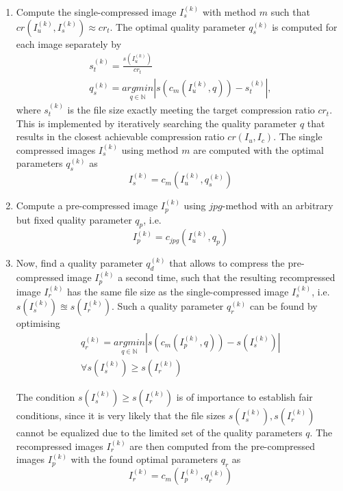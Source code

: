 \documentclass[10pt,twocolumn,letterpaper]{article}
\begin{document}
\begin{enumerate}
	\item Compute the single-compressed image $I_s^{(k)}$ with method $m$ such that $cr(I_u^{(k)}, I_s^{(k)}) \approx cr_t$. The optimal quality parameter $q_s^{(k)}$ is computed for each image separately by
	\begin{eqnarray}
	s_t^{(k)} = \frac{s(I_u^{(k)})}{cr_t} \\
	q_s^{(k)} = \underset{q \in \mathbb{N}}{argmin}|s(c_m(I_u^{(k)},q)) - s_t^{(k)}|,
	\end{eqnarray} where $s_t^{(k)}$ is the file size exactly meeting the target compression ratio $cr_t$. This is implemented by iteratively searching the quality parameter $q$ that results in the closest achievable compression ratio $cr(I_u, I_c)$. The single compressed images $I_s^{(k)}$ using method $m$ are computed with the optimal parameters $ q_s^{(k)}$ as
	\begin{equation}
	I_s^{(k)} = c_m(I_u^{(k)}, q_s^{(k)})
	\end{equation}
	
	\item Compute a pre-compressed image $I_p^{(k)}$ using $jpg$-method with an arbitrary but fixed quality parameter $q_p$, i.e. 
	\begin{equation}
		I_p^{(k)} = c_{jpg}(I_u^{(k)}, q_p)
	\end{equation}
	
	\item Now, find a quality parameter $q_d^{(k)}$ that allows to compress the pre-compressed image $I_p^{(k)}$ a second time, such that the resulting recompressed image $I_r^{(k)}$ has the same file size as the single-compressed image $I_s^{(k)}$, i.e. $s(I_s^{(k)}) \approxeq s(I_r^{(k)})$. Such a quality parameter $q_r^{(k)}$ can be found by optimising
	\begin{eqnarray}	
		q_r^{(k)} = \underset{q \in \mathbb{N}}{argmin}|s(c_m(I_p^{(k)},q)) - s(I_s^{(k)})| \\
		\forall s(I_s^{(k)}) \geq s(I_r^{(k)})
		\label{equ:recomp}
	\end{eqnarray}
	
The condition $s(I_s^{(k)}) \geq s(I_r^{(k)})$ is of importance to establish fair conditions, since it is very likely that the file sizes $s(I_s^{(k)}), s(I_r^{(k)})$  cannot be equalized due to the limited set of the quality parameters $q$. The recompressed images $I_r^{(k)}$ are then computed from the pre-compressed images $I_p^{(k)}$ with the found optimal parameters $q_r$ as
	\begin{equation}
	I_r^{(k)} = c_m(I_p^{(k)}, q_r^{(k)})
	\end{equation}
\end{enumerate}
\end{document}
